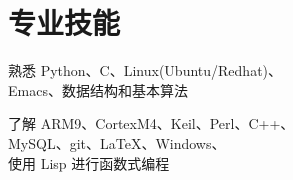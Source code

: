 \documentclass{tccv}
\begin{document}
\section{\ShiShangZhongHeiJianTi 专业技能}

\begin{factlist}

\item{\HiraginoSansGB 熟悉}{
    \HiraginoSansGB Python、C、Linux(Ubuntu/Redhat)、 \\
    Emacs、数据结构和基本算法
  }

\item{\HiraginoSansGB 了解}{
    \HiraginoSansGB ARM9、CortexM4、Keil、Perl、C++、 \\
    MySQL、git、\LaTeX、Windows、 \\
    使用 Lisp 进行函数式编程
  }

\end{factlist}
\end{document}
